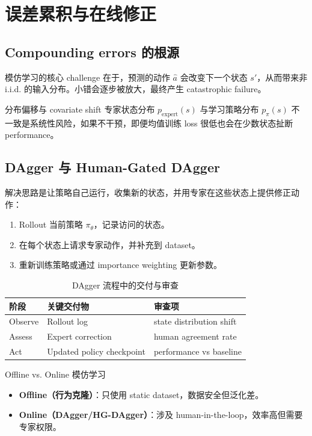 \section{误差累积与在线修正}

\subsection{Compounding errors 的根源}

模仿学习的核心 challenge 在于，预测的动作 $\hat{a}$ 会改变下一个状态 $s'$，从而带来非 i.i.d. 的输入分布。小错会逐步被放大，最终产生 catastrophic failure。

\begin{warningbox}{分布偏移与 covariate shift}
专家状态分布 $p_{\text{expert}}(s)$ 与学习策略分布 $p_{\pi}(s)$ 不一致是系统性风险，如果不干预，即便均值训练 loss 很低也会在少数状态扯断 performance。
\end{warningbox}

\subsection{DAgger 与 Human-Gated DAgger}

解决思路是让策略自己运行，收集新的状态，并用专家在这些状态上提供修正动作：
\begin{enumerate}
    \item Rollout 当前策略 $\pi_\theta$，记录访问的状态。
    \item 在每个状态上请求专家动作，并补充到 dataset。
    \item 重新训练策略或通过 importance weighting 更新参数。
\end{enumerate}

\begin{table}[H]
\centering
\begin{tabular}{p{} p{} p{}}
\toprule
阶段 & 关键交付物 & 审查项 \\
\midrule
Observe & Rollout log & state distribution shift \\
Assess & Expert correction & human agreement rate \\
Act & Updated policy checkpoint & performance vs baseline \\
\bottomrule
\end{tabular}
\caption{DAgger 流程中的交付与审查}
\end{table}

\begin{knowledgebox}{Offline vs. Online 模仿学习}
\begin{itemize}
    \item \textbf{Offline（行为克隆）}：只使用 static dataset，数据安全但泛化差。
    \item \textbf{Online（DAgger/HG-DAgger）}：涉及 human-in-the-loop，效率高但需要专家权限。
\end{itemize}
\end{knowledgebox}

